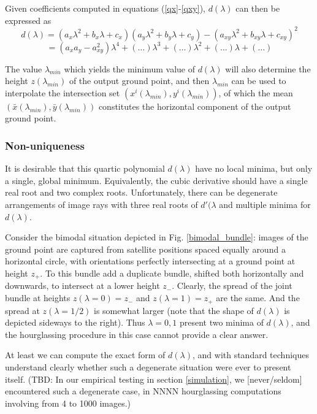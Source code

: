 \documentclass{article}
\begin{document}
Given coefficients computed in equations (\ref{qx}-\ref{qxy}),
$d(\lambda)$ can then be expressed as
\begin{equation*}\label{d}
d(\lambda) = (a_x\lambda^2 + b_x\lambda + c_x)(a_y\lambda^2 + b_y\lambda + c_y) - 
(a_{xy}\lambda^2 + b_{xy}\lambda + c_{xy})^2
\end{equation*}
\begin{equation}
= (a_xa_y-a_{xy}^2)\lambda^4 + (\ldots)\lambda^3 + (\ldots)\lambda^2 + (\ldots)\lambda + (\ldots)
\end{equation}

The value $\lambda_{min}$ which yields the minimum value of
$d(\lambda)$ will also determine the height $z(\lambda_{min})$ of the
output ground point, and then $\lambda_{min}$ can be used to
interpolate the intersection set
$(x^i(\lambda_{min}),y^i(\lambda_{min}))$, of which the mean
$(\bar{x}(\lambda_{min}),\bar{y}(\lambda_{min}))$ constitutes the
horizontal component of the output ground point.

\subsubsection{Non-uniqueness}
It is desirable that this quartic polynomial $d(\lambda)$ have no
local minima, but only a single, global minimum. Equivalently, the
cubic derivative should have a single real root and two complex
roots. Unfortunately, there can be degenerate arrangements of image
rays with three real roots of $d'(\lambda$ and multiple minima for
$d(\lambda)$.

Consider the bimodal situation depicted in Fig. \ref{bimodal_bundle}:
images of the ground point are captured from satellite positions
spaced equally around a horizontal circle, with orientations perfectly
intersecting at a ground point at height $z_+$. To this bundle add a
duplicate bundle, shifted both horizontally and downwards, to
intersect at a lower height $z_-$. Clearly, the spread of the joint
bundle at heights $z(\lambda=0)=z_-$ and $z(\lambda=1)=z_+$ are the
same. And the spread at $z(\lambda=1/2)$ is somewhat larger (note that
the shape of $d(\lambda)$ is depicted sideways to the right). Thus
$\lambda={0,1}$ present two minima of $d(\lambda)$, and the
hourglassing procedure in this case cannot provide a clear answer.

At least we can compute the exact form of $d(\lambda)$, and with
standard techniques understand clearly whether such a degenerate
situation were ever to present itself. (TBD: In our empirical testing
in section \ref{simulation}, we [never/seldom] encountered such a
degenerate case, in NNNN hourglassing computations involving from 4 to
1000 images.)
\end{document}
